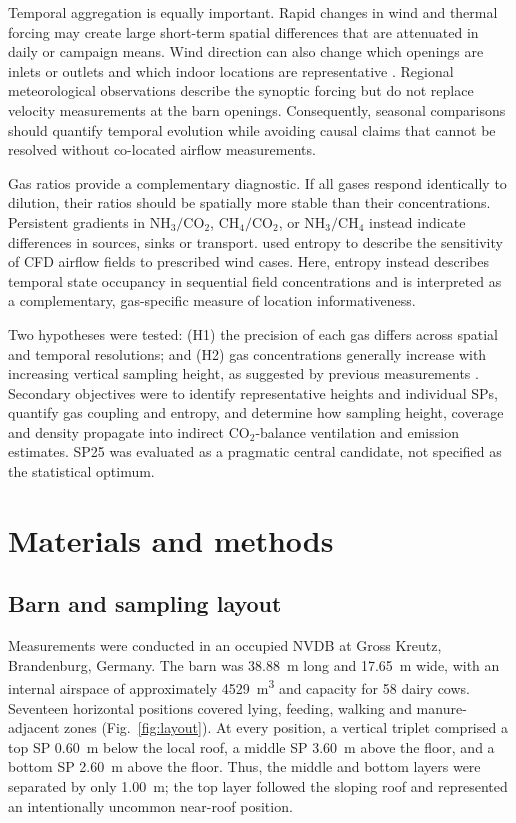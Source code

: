 ﻿\documentclass[12pt,a4paper]{article}
\begin{document}
Temporal aggregation is equally important. Rapid changes in wind and thermal forcing may create large short-term spatial differences that are attenuated in daily or campaign means. Wind direction can also change which openings are inlets or outlets and which indoor locations are representative \citep{Saha2013,Koenig2018,JankeSampling2020}. Regional meteorological observations describe the synoptic forcing but do not replace velocity measurements at the barn openings. Consequently, seasonal comparisons should quantify temporal evolution while avoiding causal claims that cannot be resolved without co-located airflow measurements.

Gas ratios provide a complementary diagnostic. If all gases respond identically to dilution, their ratios should be spatially more stable than their concentrations. Persistent gradients in \(\mathrm{NH_3}/\mathrm{CO_2}\), \(\mathrm{CH_4}/\mathrm{CO_2}\), or \(\mathrm{NH_3}/\mathrm{CH_4}\) instead indicate differences in sources, sinks or transport. \citet{Chen2026} used entropy to describe the sensitivity of CFD airflow fields to prescribed wind cases. Here, entropy instead describes temporal state occupancy in sequential field concentrations and is interpreted as a complementary, gas-specific measure of location informativeness.

Two hypotheses were tested: (H1) the precision of each gas differs across spatial and temporal resolutions; and (H2) gas concentrations generally increase with increasing vertical sampling height, as suggested by previous measurements \citep{Sahu2023}. Secondary objectives were to identify representative heights and individual SPs, quantify gas coupling and entropy, and determine how sampling height, coverage and density propagate into indirect \(\mathrm{CO_2}\)-balance ventilation and emission estimates. SP25 was evaluated as a pragmatic central candidate, not specified as the statistical optimum.

\section{Materials and methods}
\subsection{Barn and sampling layout}
Measurements were conducted in an occupied NVDB at Gross Kreutz, Brandenburg, Germany. The barn was \SI{38.88}{m} long and \SI{17.65}{m} wide, with an internal airspace of approximately \SI{4529}{m^3} and capacity for 58 dairy cows. Seventeen horizontal positions covered lying, feeding, walking and manure-adjacent zones (Fig.~\ref{fig:layout}). At every position, a vertical triplet comprised a top SP \SI{0.60}{m} below the local roof, a middle SP \SI{3.60}{m} above the floor, and a bottom SP \SI{2.60}{m} above the floor. Thus, the middle and bottom layers were separated by only \SI{1.00}{m}; the top layer followed the sloping roof and represented an intentionally uncommon near-roof position.
\end{document}
